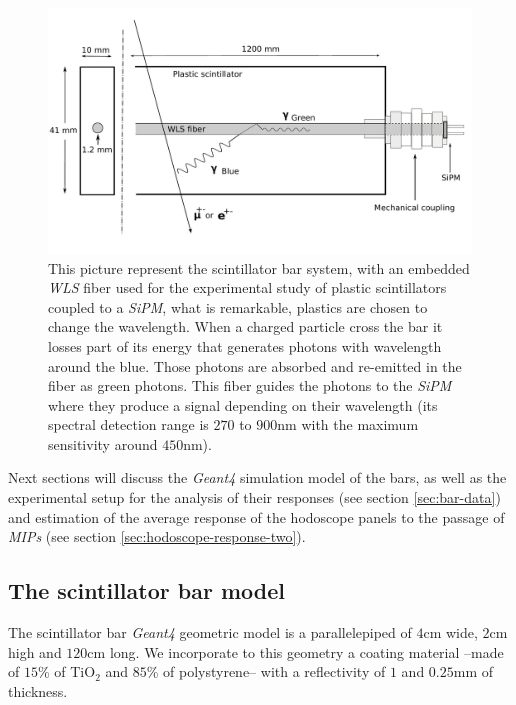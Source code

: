 \documentclass[submitting]{nst}
\begin{document}
\begin{figure}[h!] %
    \centering
        \includegraphics[scale=0.21]{Figures/esquema_barra.jpeg}
   \caption{This picture represent the scintillator bar system, with an embedded \textsl{WLS} fiber used for the experimental study of plastic scintillators coupled to a \textsl{SiPM}, what is remarkable, plastics are chosen to change the wavelength. When a charged particle cross the bar it losses part of its energy that generates photons with wavelength around the blue. Those photons are absorbed and re-emitted in the fiber as green photons. This fiber guides the photons to the \textsl{SiPM} where they produce a signal depending on their wavelength (its spectral detection range is $270$ to $900$nm with the maximum sensitivity around $450$nm).}\label{esquema_centelladora}
\end{figure}

Next sections will discuss the \textsl{Geant4} simulation model of the bars, as well as the experimental setup for the analysis of their responses (see section \ref{sec:bar-data}) and estimation of the average response of the hodoscope panels to the passage of \textsl{MIPs} (see section \ref{sec:hodoscope-response-two}). 


\subsection{The scintillator bar model} \label{sec:bar-simulation}%
The scintillator bar \textsl{Geant4} geometric model is a parallelepiped of $4$cm wide, $2$cm high and $120$cm long. We incorporate to this geometry a coating material --made of $15$\% of TiO$_2$ and $85$\% of polystyrene-- with a reflectivity of $1$ and $0.25$mm of thickness.
\end{document}
